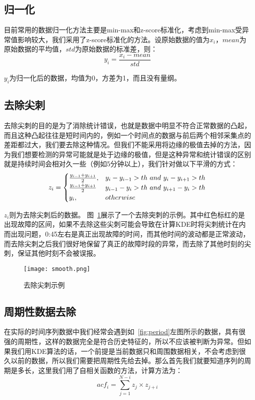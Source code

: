 \subsection{归一化}
目前常用的数据归一化方法主要是min-max和z-score标准化，考虑到min-max受异常值影响较大，我们采用了z-score标准化的方法。设原始数据的值为$x_i$，$mean$为原始数据的平均值，$std$为原始数据的标准差，则：
\begin{equation*}
y_i = \frac{x_i-mean}{std}
\end{equation*}

$y_i$为归一化后的数据，均值为0，方差为1，而且没有量纲。
\subsection{去除尖刺}
去除尖刺的目的是为了消除统计错误，也就是数据中明显不符合正常数据的凸起，而且这种凸起往往是短时间内的，例如一个时间点的数据与前后两个相邻采集点的差距都过大，我们要去除这种情况。但我们不能采用将边缘的极值去掉的方法，因为我们想要检测的异常可能就是处于边缘的极值，但是这种异常和统计错误的区别就是持续时间会相对久一些（例如5分钟以上），我们针对做以下平滑的方式：
\begin{equation*}
z_i = \begin{cases} \frac{y_{i-1} + y_{i+1}}{2}, & y_i - y_{i-1} > th\ and\ y_i - y_{i+1} > th \cr \frac{y_{i-1} + y_{i+1}}{2} & y_{i-1} - y_i > th\ and\ y_{i+1} - y_i > th \cr y_i, & otherwise  \end{cases}
\end{equation*}

$z_i$则为去除尖刺后的数据。
图~\ref{fig:smooth}展示了一个去除突刺的示例。其中红色标红的是出现故障的区间，如果不去除这些尖刺可能会导致在计算KDE时将尖刺统计在内而出现问题，0:45左右是真正出现故障的时间，而其他时间的波动都是正常波动，而去除尖刺之后我们很好地保留了真正的故障时段的异常，而去除了其他时刻的尖刺，保证其他时刻不会被误报。

\begin{figure}[htbp]
  \centering
  \texttt{[image: smooth.png]}
  \caption{去除尖刺示例}
  \label{fig:smooth}
\end{figure}
\subsection{周期性数据去除}

在实际的时间序列数据中我们经常会遇到如~\ref{fig:period}左图所示的数据，具有很强的周期性，这样的数据完全是符合历史特征的，所以不应该被判断为异常。但如果我们用KDE算法的话，一个前提是当前数据只和周围数据相关，不会考虑到很久以前的数据，所以我们需要把周期性先给去掉。那么首先我们就要知道序列的周期是多长，这里我们用了自相关函数的方法，计算方法为：
\begin{equation*}
  acf_i = \sum_{j=1}^{N-i}z_j\times z_{j+i}
\end{equation*}

